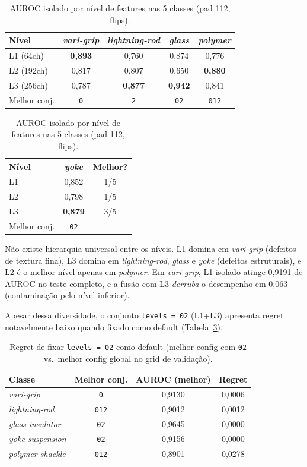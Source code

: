 \documentclass[conference]{IEEEtran}
\begin{document}
\begin{table}[htb]
\centering
\caption{AUROC isolado por nível de features nas 5 classes (pad 112, flips).}
\label{tab:per_level}
\begin{tabular}{@{}lcccc@{}}
\toprule
Nível & \textit{vari-grip} & \textit{lightning-rod} & \textit{glass} & \textit{polymer} \\
\midrule
L1 (64ch)  & \textbf{0,893} & 0,760 & 0,874 & 0,776 \\
L2 (192ch) & 0,817 & 0,807 & 0,650 & \textbf{0,880} \\
L3 (256ch) & 0,787 & \textbf{0,877} & \textbf{0,942} & 0,841 \\
\midrule
Melhor conj. & \texttt{0} & \texttt{2} & \texttt{02} & \texttt{012} \\
\bottomrule
\end{tabular}
\begin{tabular}{@{}lcc@{}}
\toprule
Nível & \textit{yoke} & Melhor? \\
\midrule
L1 & 0,852 & 1/5 \\
L2 & 0,798 & 1/5 \\
L3 & \textbf{0,879} & 3/5 \\
\midrule
Melhor conj. & \texttt{02} & \\
\bottomrule
\end{tabular}
\end{table}

Não existe hierarquia universal entre os níveis. L1 domina em \textit{vari-grip} (defeitos de textura fina), L3 domina em \textit{lightning-rod}, \textit{glass} e \textit{yoke} (defeitos estruturais), e L2 é o melhor nível apenas em \textit{polymer}. Em \textit{vari-grip}, L1 isolado atinge 0{,}9191 de AUROC no teste completo, e a fusão com L3 \textit{derruba} o desempenho em 0{,}063 (contaminação pelo nível inferior).

Apesar dessa diversidade, o conjunto \texttt{levels\,=\,02} (L1+L3) apresenta regret notavelmente baixo quando fixado como default (Tabela~\ref{tab:regret}).

\begin{table}[htb]
\centering
\caption{Regret de fixar \texttt{levels\,=\,02} como default (melhor config com \texttt{02} vs.\ melhor config global no grid de validação).}
\label{tab:regret}
\begin{tabular}{@{}lccc@{}}
\toprule
Classe & Melhor conj. & AUROC (melhor) & Regret \\
\midrule
\textit{vari-grip}       & \texttt{0}   & 0,9130 & 0,0006 \\
\textit{lightning-rod}    & \texttt{012} & 0,9012 & 0,0012 \\
\textit{glass-insulator}  & \texttt{02}  & 0,9645 & 0,0000 \\
\textit{yoke-suspension}  & \texttt{02}  & 0,9156 & 0,0000 \\
\textit{polymer-shackle}  & \texttt{012} & 0,8901 & 0,0278 \\
\bottomrule
\end{tabular}
\end{table}
\end{document}
